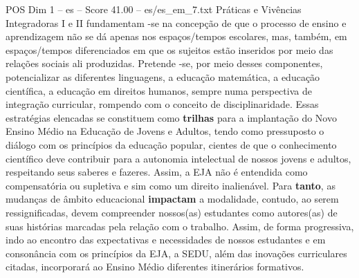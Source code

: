 \begin{textsample}{POS Dim 1 – es – Score 41.00 – es/es\_em\_7.txt}
Práticas e Vivências Integradoras I e II fundamentam -se na concepção de que o processo de ensino e aprendizagem não se dá apenas nos espaços/tempos escolares, mas, também, em espaços/tempos diferenciados em que os sujeitos estão inseridos por meio das relações sociais ali produzidas.
Pretende -se, por meio desses componentes, potencializar as diferentes linguagens, a educação matemática, a educação científica, a educação em direitos humanos, sempre numa perspectiva de integração curricular, rompendo com o conceito de disciplinaridade.
Essas estratégias elencadas se constituem como \textbf{trilhas} para a implantação do Novo Ensino Médio na Educação de Jovens e Adultos, tendo como pressuposto o diálogo com os princípios da educação popular, cientes de que o conhecimento científico deve contribuir para a autonomia intelectual de nossos jovens e adultos, respeitando seus saberes e fazeres.
Assim, a EJA não é entendida como compensatória ou supletiva e sim como um direito inalienável.
Para \textbf{tanto}, as mudanças de âmbito educacional \textbf{impactam} a modalidade, contudo, ao serem ressignificadas, devem compreender nossos(as) estudantes como autores(as) de suas histórias marcadas pela relação com o trabalho.
Assim, de forma progressiva, indo ao encontro das expectativas e necessidades de nossos estudantes e em consonância com os princípios da EJA, a SEDU, além das inovações curriculares citadas, incorporará ao Ensino Médio diferentes itinerários formativos.

\end{textsample}
